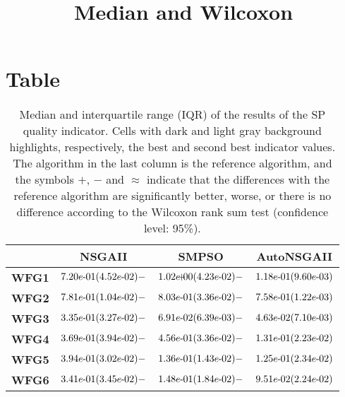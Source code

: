 \documentclass{article}
\title{Median and Wilcoxon}
\author{}
\begin{document}
\maketitle
\section{Table}
\begin{table}[!htp]
  \caption{Median and interquartile range (IQR) of the results of the SP quality indicator. Cells with dark and light gray background highlights, respectively, the best and second best indicator values. The algorithm in the last column is the reference algorithm, and the symbols $+$, $-$ and $\approx$ indicate that the differences with the reference algorithm are significantly better, worse, or there is no difference according to the Wilcoxon rank sum test (confidence level: 95\%).}
  \label{table:SP}
  \centering
  \begin{tiny}
  \begin{tabular}{c|ccc}
      & \textbf{NSGAII} & \textbf{SMPSO} & \textbf{AutoNSGAII} \\\hline
\textbf{WFG1} & $\cellcolor{gray25} {7.20e\makebox[0.1cm]{-}01(4.52e\makebox[0.1cm]{-}02)-} $ & $ {1.02e\makebox[0.1cm]{+}00(4.23e\makebox[0.1cm]{-}02)-} $ & $ \cellcolor{gray95} 1.18e\makebox[0.1cm]{-}01(9.60e\makebox[0.1cm]{-}03)$ \\
\textbf{WFG2} & $\cellcolor{gray25} {7.81e\makebox[0.1cm]{-}01(1.04e\makebox[0.1cm]{-}02)-} $ & $ {8.03e\makebox[0.1cm]{-}01(3.36e\makebox[0.1cm]{-}02)-} $ & $ \cellcolor{gray95} 7.58e\makebox[0.1cm]{-}01(1.22e\makebox[0.1cm]{-}03)$ \\
\textbf{WFG3} & ${3.35e\makebox[0.1cm]{-}01(3.27e\makebox[0.1cm]{-}02)-} $ & $ \cellcolor{gray25} {6.91e\makebox[0.1cm]{-}02(6.39e\makebox[0.1cm]{-}03)-} $ & $ \cellcolor{gray95} 4.63e\makebox[0.1cm]{-}02(7.10e\makebox[0.1cm]{-}03)$ \\
\textbf{WFG4} & $\cellcolor{gray25} {3.69e\makebox[0.1cm]{-}01(3.94e\makebox[0.1cm]{-}02)-} $ & $ {4.56e\makebox[0.1cm]{-}01(3.36e\makebox[0.1cm]{-}02)-} $ & $ \cellcolor{gray95} 1.31e\makebox[0.1cm]{-}01(2.23e\makebox[0.1cm]{-}02)$ \\
\textbf{WFG5} & ${3.94e\makebox[0.1cm]{-}01(3.02e\makebox[0.1cm]{-}02)-} $ & $ \cellcolor{gray25} {1.36e\makebox[0.1cm]{-}01(1.43e\makebox[0.1cm]{-}02)-} $ & $ \cellcolor{gray95} 1.25e\makebox[0.1cm]{-}01(2.34e\makebox[0.1cm]{-}02)$ \\
\textbf{WFG6} & ${3.41e\makebox[0.1cm]{-}01(3.45e\makebox[0.1cm]{-}02)-} $ & $ \cellcolor{gray25} {1.48e\makebox[0.1cm]{-}01(1.84e\makebox[0.1cm]{-}02)-} $ & $ \cellcolor{gray95} 9.51e\makebox[0.1cm]{-}02(2.24e\makebox[0.1cm]{-}02)$ \\

\end{tabular}
\end{tiny}
\end{table}
\end{document}
